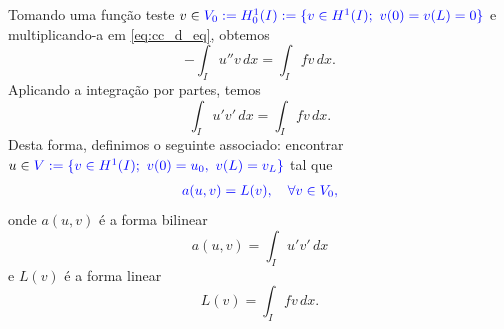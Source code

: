 Tomando uma função teste $v\in \color{blue}V_0 := H^1_0(I):=\{v\in H^1(I);~v(0)=v(L)=0\}$ e multiplicando-a em \eqref{eq:cc_d_eq}, obtemos
\begin{equation}
  - \int_I u''v\,dx = \int_I fv\,dx.
\end{equation}
Aplicando a integração por partes, temos
\begin{equation}
  \int_I u'v'\,dx = \int_I fv\,dx.
\end{equation}
Desta forma, definimos o seguinte  associado: encontrar $u\in \color{blue}V := \{v\in H^1(I);~v(0)=u_0,~v(L)=v_L\}$ tal que
\begin{align}\color{blue}a(u,v) = L(v),\quad\forall v\in V_0,
\end{align}
onde $a(u,v)$ é a forma bilinear
\begin{equation}
  a(u,v) = \int_I u'v'\,dx
\end{equation}
e $L(v)$ é a forma linear
\begin{equation}
  L(v) = \int_I fv\,dx.
\end{equation}

